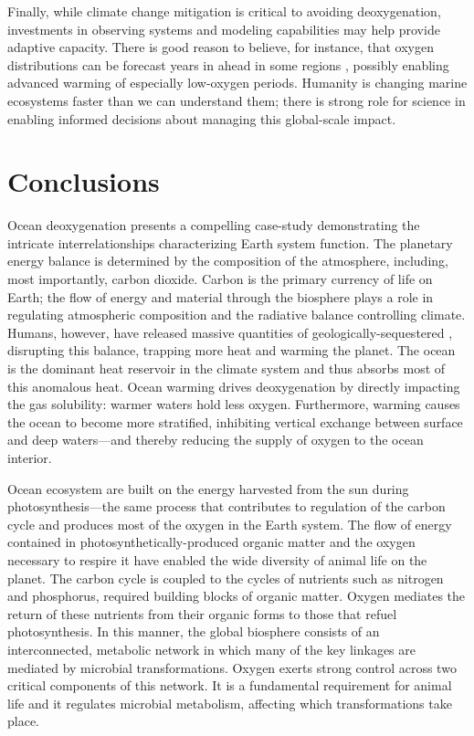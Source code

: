 \documentclass[draft,linenumbers]{report_chapter}
\begin{document}
Finally, while climate change mitigation is critical to avoiding deoxygenation, investments in observing systems and modeling capabilities may help provide adaptive capacity.
There is good reason to believe, for instance, that oxygen distributions can be forecast years in ahead in some regions \citep[e.g.,][]{Pozo-Buil-Di-Lorenzo-2017}, possibly enabling advanced warming of especially low-oxygen periods.
Humanity is changing marine ecosystems faster than we can understand them; there is strong role for science in enabling informed decisions about managing this global-scale impact.

\section{Conclusions}

Ocean deoxygenation presents a compelling case-study demonstrating the intricate interrelationships characterizing Earth system function.
The planetary energy balance is determined by the composition of the atmosphere, including, most importantly, carbon dioxide.
Carbon is the primary currency of life on Earth; the flow of energy and material through the biosphere plays a role in regulating atmospheric composition and the radiative balance controlling climate.
Humans, however, have released massive quantities of geologically-sequestered , disrupting this balance, trapping more heat and warming the planet.
The ocean is the dominant heat reservoir in the climate system and thus absorbs most of this anomalous heat.
Ocean warming drives deoxygenation by directly impacting the gas solubility: warmer waters hold less oxygen.
Furthermore, warming causes the ocean to become more stratified, inhibiting vertical exchange between surface and deep waters---and thereby reducing the supply of oxygen to the ocean interior.

Ocean ecosystem are built on the energy harvested from the sun during photosynthesis---the same process that contributes to regulation of the carbon cycle and produces most of the oxygen in the Earth system.
The flow of energy contained in photosynthetically-produced organic matter and the oxygen necessary to respire it have enabled the wide diversity of animal life on the planet.
The carbon cycle is coupled to the cycles of nutrients such as nitrogen and phosphorus, required building blocks of organic matter.
Oxygen mediates the return of these nutrients from their organic forms to those that refuel photosynthesis.
In this manner, the global biosphere consists of an interconnected, metabolic network in which many of the key linkages are mediated by microbial transformations.
Oxygen exerts strong control across two critical components of this network.
It is a fundamental requirement for animal life and it regulates microbial metabolism, affecting which transformations take place.
\end{document}
